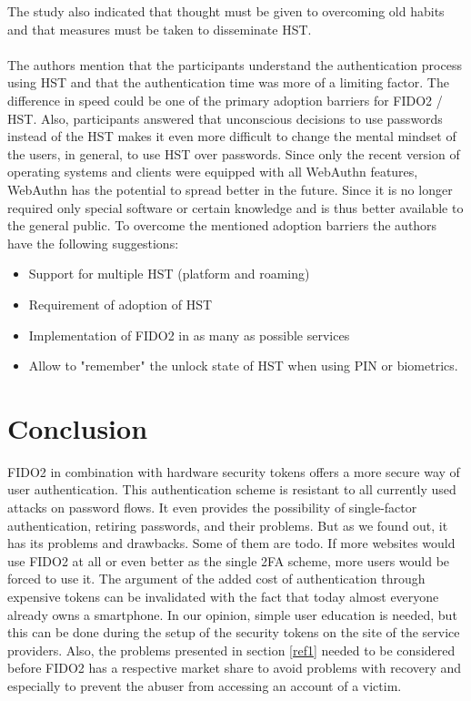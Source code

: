 \documentclass[runningheads]{llncs}
\begin{document}
The study also indicated that thought must be given to overcoming old habits and that measures must be taken to disseminate HST.

\paragraph{}
The authors mention that the participants understand the authentication process using HST and that the authentication time was more of a limiting factor. The difference in speed could be one of the primary adoption barriers for FIDO2 / HST. Also, participants answered that unconscious decisions to use passwords instead of the HST makes it even more difficult to change the mental mindset of the users, in general, to use HST over passwords. Since only the recent version of operating systems and clients were equipped with all WebAuthn features, WebAuthn has the potential to spread better in the future. Since it is no longer required only special software or certain knowledge and is thus better available to the general public. To overcome the mentioned adoption barriers the authors have the following suggestions:
\begin{itemize}
  \item Support for multiple HST (platform and roaming)
  \item Requirement of adoption of HST
  \item Implementation of FIDO2 in as many as possible services
  \item Allow to "remember" the unlock state of HST when using PIN or biometrics.
\end{itemize}
\cite{255646}

\section{Conclusion}
FIDO2 in combination with hardware security tokens offers a more secure way of user authentication. This authentication scheme is resistant to all currently used attacks on password flows. It even provides the possibility of single-factor authentication, retiring passwords, and their problems. But as we found out, it has its problems and drawbacks. Some of them are todo. If more websites would use FIDO2 at all or even better as the single 2FA scheme, more users would be forced to use it. The argument of the added cost of authentication through expensive tokens can be invalidated with the fact that today almost everyone already owns a smartphone. In our opinion, simple user education is needed, but this can be done during the setup of the security tokens on the site of the service providers. Also, the problems presented in section \ref{ref1} needed to be considered before FIDO2 has a respective market share to avoid problems with recovery and especially to prevent the abuser from accessing an account of a victim.




\end{document}

